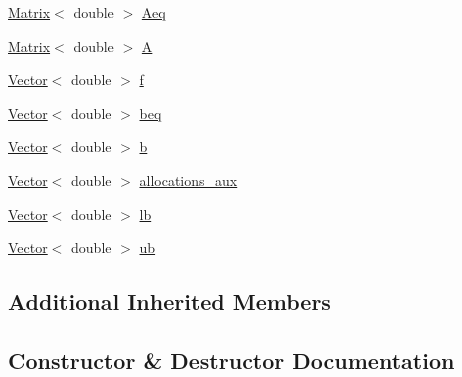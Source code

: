 \begin{DoxyCompactItemize}
\item 
\mbox{\hyperlink{classMatrix}{Matrix}}$<$ double $>$ \mbox{\hyperlink{classTransfers_a1c2d27eb4e9294e32f04b5e7d929e71f_a1c2d27eb4e9294e32f04b5e7d929e71f}{Aeq}}
\item 
\mbox{\hyperlink{classMatrix}{Matrix}}$<$ double $>$ \mbox{\hyperlink{classTransfers_a2acc8cfe6a1978d2468be289db636226_a2acc8cfe6a1978d2468be289db636226}{A}}
\item 
\mbox{\hyperlink{classVector}{Vector}}$<$ double $>$ \mbox{\hyperlink{classTransfers_a77db57256093921b04035c1e38a20060_a77db57256093921b04035c1e38a20060}{f}}
\item 
\mbox{\hyperlink{classVector}{Vector}}$<$ double $>$ \mbox{\hyperlink{classTransfers_a39d45672a21ce1a45925eceea79b921a_a39d45672a21ce1a45925eceea79b921a}{beq}}
\item 
\mbox{\hyperlink{classVector}{Vector}}$<$ double $>$ \mbox{\hyperlink{classTransfers_a24e66988fb2e50d151859813fda2e740_a24e66988fb2e50d151859813fda2e740}{b}}
\item 
\mbox{\hyperlink{classVector}{Vector}}$<$ double $>$ \mbox{\hyperlink{classTransfers_a22f332495395f41b340e370535a6b27a_a22f332495395f41b340e370535a6b27a}{allocations\+\_\+aux}}
\item 
\mbox{\hyperlink{classVector}{Vector}}$<$ double $>$ \mbox{\hyperlink{classTransfers_a10e5cae64016e52eca5dccc8e01e9791_a10e5cae64016e52eca5dccc8e01e9791}{lb}}
\item 
\mbox{\hyperlink{classVector}{Vector}}$<$ double $>$ \mbox{\hyperlink{classTransfers_aab0d3f08ed2897d9a74c9970612231d5_aab0d3f08ed2897d9a74c9970612231d5}{ub}}
\end{DoxyCompactItemize}
\subsection*{Additional Inherited Members}


\subsection{Constructor \& Destructor Documentation}
\mbox{\label{classTransfers_a40555bc28e085d0e119a9f039317c79f_a40555bc28e085d0e119a9f039317c79f}} 
